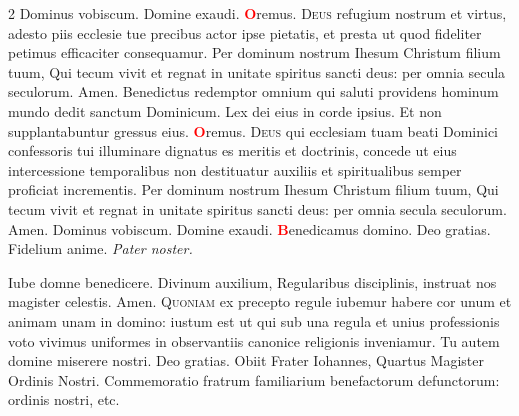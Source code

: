 \begin{multicols}{2}
 Dominus vobiscum.  Domine exaudi.
\newline \textcolor{Red}{\bfseries O}remus. 
\lettrine[lines=2]{\zallmancaps \color{Red} D}{eus} refugium nostrum et virtus, adesto piis ecclesie tue precibus actor ipse pietatis, et presta ut quod fideliter petimus efficaciter consequamur. Per dominum nostrum Ihesum Christum filium tuum, Qui tecum vivit et regnat in unitate spiritus sancti deus: per omnia secula seculorum. \R Amen.
\newline {}
\newline {} Benedictus redemptor omnium qui saluti providens hominum mundo dedit sanctum Dominicum.
\newline \V Lex dei eius in corde ipsius. \R Et non supplantabuntur gressus eius.
\newline \textcolor{Red}{\bfseries O}remus. 
\lettrine[lines=2]{\zallmancaps \color{Blue} D}{eus} qui ecclesiam tuam beati Dominici confessoris tui illuminare dignatus es meritis et doctrinis, concede ut eius intercessione temporalibus non destituatur auxiliis et spiritualibus semper proficiat incrementis. Per dominum nostrum Ihesum Christum filium tuum, Qui tecum vivit et regnat in unitate spiritus sancti deus: per omnia secula seculorum. \R Amen.
 Dominus vobiscum.  Domine exaudi.
\newline \textcolor{Red}{\bfseries B}enedicamus domino. \R Deo gratias.
\newline {}
\newline Fidelium anime.  \textit{Pater noster.}


\vspace{+1em}
\newline {}
\newline {}
\newline {} Iube domne benedicere.  Divinum auxilium, 
\newline Regularibus disciplinis, instruat nos magister celestis. \R Amen.
\newline {}
\lettrine[lines=2]{\zallmancaps \color{Blue} Q}{uoniam} ex precepto regule iubemur habere cor unum et animam unam in domino: iustum est ut qui sub una regula et unius professionis voto vivimus uniformes in observantiis canonice religionis inveniamur. Tu autem domine miserere nostri. \R Deo gratias.
\newline {} Obiit Frater Iohannes, Quartus Magister Ordinis Nostri.
\newline {} Commemoratio fratrum familiarium benefactorum defunctorum: ordinis nostri, etc.




\end{multicols}
